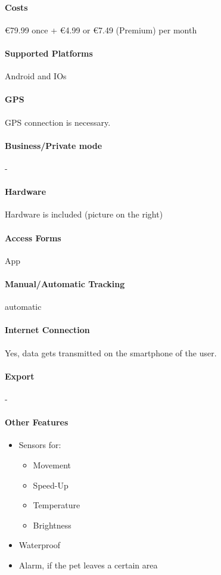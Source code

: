 \paragraph{Costs}\euro 79.99 once + \euro 4.99 or \euro 7.49 (Premium) per month 
\paragraph{Supported Platforms}Android and IOs 
\paragraph{GPS} GPS connection is necessary.
\paragraph{Business/Private mode} -
\paragraph{Hardware}Hardware is included (picture on the right)
\paragraph{Access Forms}App
\paragraph{Manual/Automatic Tracking}automatic
\paragraph{Internet Connection}Yes, data gets transmitted on the smartphone of the user.
\paragraph{Export}-
\paragraph{Other Features}
\begin{itemize}
\item Sensors for:
\begin{itemize}
\item Movement
\item Speed-Up
\item Temperature
\item Brightness
\end{itemize}
\item Waterproof
\item Alarm, if the pet leaves a certain area

\end{itemize}


